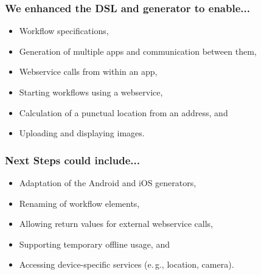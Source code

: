 \begin{frame}
    \frametitle{We enhanced the DSL and generator to enable...}
    
    \begin{itemize}
    	\item Workflow specifications,
    	\item Generation of multiple apps and communication between them,
    	\item Webservice calls from within an app,
    	\item Starting workflows using a webservice,
    	\item Calculation of a punctual location from an address, and
    	\item Uploading and displaying images.
    \end{itemize}

\end{frame}

\begin{frame}
    \frametitle{Next Steps could include...}

	\begin{itemize}
		\item Adaptation of the Android and iOS generators,
		\item Renaming of workflow elements,
		\item Allowing return values for external webservice calls,
		\item Supporting temporary offline usage, and
		\item Accessing device-specific services (e.\,g., location, camera).
	\end{itemize}
\end{frame}

